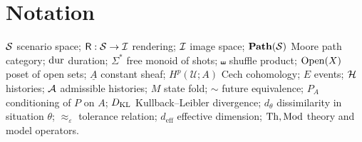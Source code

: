 \chapter{Notation}
\label{app:notation}

\noindent
$\mathcal{S}$ scenario space; $\mathsf{R}:\mathcal{S}\to\mathcal{I}$ rendering; $\mathcal{I}$ image space; $\mathbf{Path}(\mathcal{S})$ Moore path category; $\operatorname{dur}$ duration; $\Sigma^*$ free monoid of shots; $\shuffle$ shuffle product; $\mathrm{Open}(X)$ poset of open sets; $\underline{A}$ constant sheaf; $H^p(\mathcal{U};A)$ Cech cohomology; $E$ events; $\mathcal{H}$ histories; $\mathcal{A}$ admissible histories; $M$ state fold; $\sim$ future equivalence; $P_A$ conditioning of $P$ on $A$; $D_{\mathrm{KL}}$ Kullback--Leibler divergence; $d_\theta$ dissimilarity in situation $\theta$; $\approx_\varepsilon$ tolerance relation; $d_{\mathrm{eff}}$ effective dimension; $\operatorname{Th},\operatorname{Mod}$ theory and model operators.

